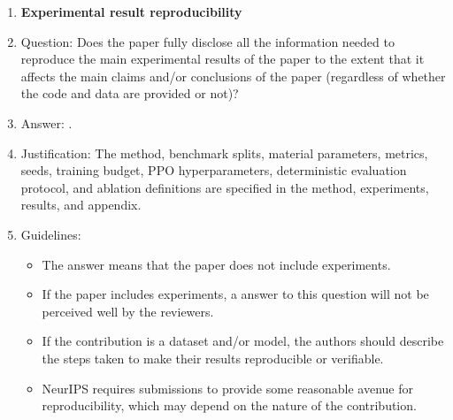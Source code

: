 \begin{enumerate}
\item {\bf Experimental result reproducibility}
    \item[] Question: Does the paper fully disclose all the information needed to reproduce the main experimental results of the paper to the extent that it affects the main claims and/or conclusions of the paper (regardless of whether the code and data are provided or not)?
    \item[] Answer: \answerYes{}.
    \item[] Justification: The method, benchmark splits, material parameters, metrics, seeds, training budget, PPO hyperparameters, deterministic evaluation protocol, and ablation definitions are specified in the method, experiments, results, and appendix.
    \item[] Guidelines:
    \begin{itemize}
        \item The answer \answerNA{} means that the paper does not include experiments.
        \item If the paper includes experiments, a \answerNo{} answer to this question will not be perceived well by the reviewers.
        \item If the contribution is a dataset and/or model, the authors should describe the steps taken to make their results reproducible or verifiable.
        \item NeurIPS requires submissions to provide some reasonable avenue for reproducibility, which may depend on the nature of the contribution.
    \end{itemize}


\end{enumerate}
